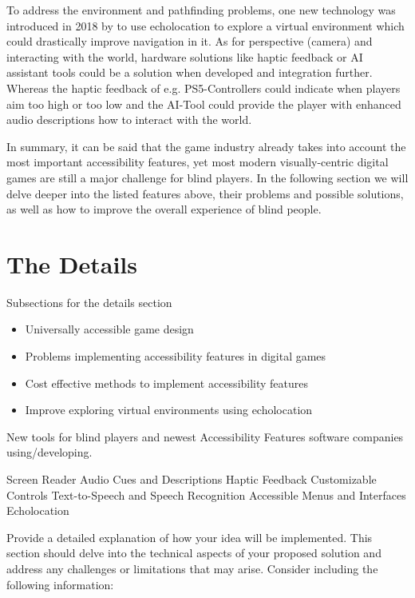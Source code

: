 \documentclass[sigconf,natbib=false,10pt]{acmart}
\begin{document}
    To address the environment and pathfinding problems, one new technology was introduced in 2018 by \textcite{andrade_echo-house_2018} to use echolocation to explore a virtual environment which could drastically improve navigation in it.
    As for perspective (camera) and interacting with the world, hardware solutions like haptic feedback or AI assistant tools could be a solution when developed and integration further.
    Whereas the haptic feedback of e.g. PS5-Controllers could indicate when players aim too high or too low and the AI-Tool could provide the player with enhanced audio descriptions how to interact with the world.
    
    In summary, it can be said that the game industry already takes into account the most important accessibility features, yet most modern visually-centric digital games are still a major challenge for blind players.
    In the following section we will delve deeper into the listed features above, their problems and possible solutions, as well as how to improve the overall experience of blind people.
	
	\section{The Details}
	
	Subsections for the details section
	\begin{itemize}
		\item Universally accessible game design
		\item Problems implementing accessibility features in digital games
		\item Cost effective methods to implement accessibility features
		\item Improve exploring virtual environments using echolocation
	\end{itemize}

	New tools for blind players and newest Accessibility Features software companies using/developing.
	
	Screen Reader
	Audio Cues and Descriptions
	Haptic Feedback
	Customizable Controls
	Text-to-Speech and Speech Recognition
	Accessible Menus and Interfaces
	Echolocation
	
	Provide a detailed explanation of how your idea will be implemented. This section should delve into the technical aspects of your proposed solution and address any challenges or limitations that may arise. Consider including the following information:
	
\end{document}
